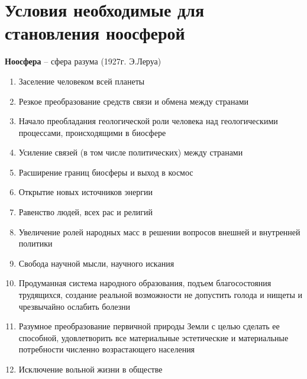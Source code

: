 \section{Условия необходимые для становления ноосферой}

\textbf{Ноосфера} -- сфера разума (1927г. Э.Леруа)

\begin{enumerate}
    \item Заселение человеком всей планеты
    \item Резкое преобразование средств связи и обмена между странами
    \item Начало преобладания геологической роли человека над
        геологическими процессами, происходящими в биосфере
    \item Усиление связей (в том числе политических) между странами
    \item Расширение границ биосферы и выход в космос
    \item Открытие новых источников энергии
    \item Равенство людей, всех рас и религий
    \item Увеличение ролей народных масс в решении вопросов
        внешней и внутренней политики
    \item Свобода научной мысли, научного искания
    \item Продуманная система народного образования, подъем
        благосостояния трудящихся, создание реальной
        возможности не допустить голода и
        нищеты и чрезвычайно ослабить болезни
    \item Разумное преобразование первичной природы Земли с целью сделать
        ее способной, удовлетворить все материальные эстетические и
        материальные потребности численно возрастающего населения
    \item Исключение вольной жизни в обществе
\end{enumerate}
